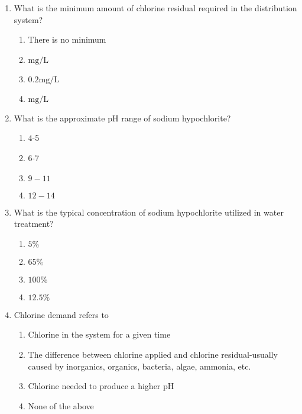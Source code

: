 \begin{enumerate}
\item  What is the minimum amount of chlorine residual required in the distribution system?\\
\begin{enumerate}
\item There is no minimum\\
\item $\mathrm{mg} / \mathrm{L}$\\
\item $0.2 \mathrm{mg} / \mathrm{L}$\\
\item $\mathrm{mg} / \mathrm{L}$
\end{enumerate}

\item  What is the approximate $\mathrm{pH}$ range of sodium hypochlorite?\\
\begin{enumerate}
\item 4-5\\
\item 6-7\\
\item $9-11$\\
\item $12-14$
\end{enumerate}

\item  What is the typical concentration of sodium hypochlorite utilized in water treatment?\\
\begin{enumerate}
\item $5 \%$\\
\item $65 \%$\\
\item $100 \%$\\
\item $12.5 \%$
\end{enumerate}

\item  Chlorine demand refers to\\
\begin{enumerate}
\item Chlorine in the system for a given time\\
\item The difference between chlorine applied and chlorine residual-usually caused by inorganics, organics, bacteria, algae, ammonia, etc.\\
\item Chlorine needed to produce a higher $\mathrm{pH}$\\
\item None of the above
\end{enumerate}


\end{enumerate}
